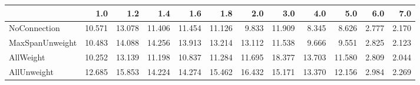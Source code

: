 \begin{tabular}{lrrrrrrrrrrr}
\toprule
{} &    1.0 &    1.2 &    1.4 &    1.6 &    1.8 &    2.0 &    3.0 &    4.0 &    5.0 &   6.0 &   7.0 \\
\midrule
NoConnection    & 10.571 & 13.078 & 11.406 & 11.454 & 11.126 &  9.833 & 11.909 &  8.345 &  8.626 & 2.777 & 2.170 \\
MaxSpanUnweight & 10.483 & 14.088 & 14.256 & 13.913 & 13.214 & 13.112 & 11.538 &  9.666 &  9.551 & 2.825 & 2.123 \\
AllWeight       & 10.252 & 13.139 & 11.198 & 10.837 & 11.284 & 11.695 & 18.377 & 13.703 & 11.580 & 2.809 & 2.044 \\
AllUnweight     & 12.685 & 15.853 & 14.224 & 14.274 & 15.462 & 16.432 & 15.171 & 13.370 & 12.156 & 2.984 & 2.269 \\
\bottomrule
\end{tabular}
